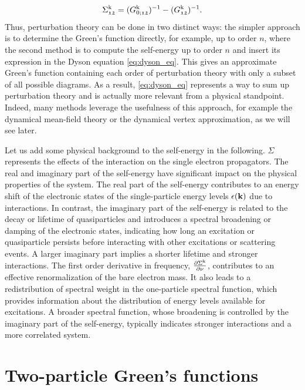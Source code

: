 \documentclass[../../main.tex]{subfiles}
\begin{document}
\begin{align}
	\Sigma_{\mathfrak{12}}^{\text{k}}=(G_{0;\mathfrak{12}}^{\text{k}})^{-1}-(G_{\mathfrak{12}}^{\text{k}})^{-1}.
\end{align}
Thus, perturbation theory can be done in two distinct ways: the simpler approach is to determine the Green's function directly, for example, up to order $n$, where the second method is to compute the self-energy up to order $n$ and insert its expression in the Dyson equation \eqref{eq:dyson_eq}. This gives an approximate Green's function containing each order of perturbation theory with only a subset of all possible diagrams. As a result, \eqref{eq:dyson_eq} represents a way to sum up perturbation theory and is actually more relevant from a physical standpoint. Indeed, many methods leverage the usefulness of this approach, for example the dynamical mean-field theory or the dynamical vertex approximation, as we will see later.

Let us add some physical background to the self-energy in the following. $\Sigma$ represents the effects of the interaction on the single electron propagators. The real and imaginary part of the self-energy have significant impact on the physical properties of the system. The real part of the self-energy contributes to an energy shift of the electronic states of the single-particle energy levels $\epsilon(\textbf{k})$ due to interactions. In contrast, the imaginary part of the self-energy is related to the decay or lifetime of quasiparticles and introduces a spectral broadening or damping of the electronic states, indicating how long an excitation or quasiparticle persists before interacting with other excitations or scattering events. A larger imaginary part implies a shorter lifetime and stronger interactions. The first order derivative in frequency, $\frac{\partial \Sigma^{\text{k}}}{\partial \nu}$, contributes to an effective renormalization of the bare electron mass. It also leads to a redistribution of spectral weight in the one-particle spectral function, which provides information about the distribution of energy levels available for excitations. A broader spectral function, whose broadening is controlled by the imaginary part of the self-energy, typically indicates stronger interactions and a more correlated system.

\section{Two-particle Green's functions}
\end{document}
